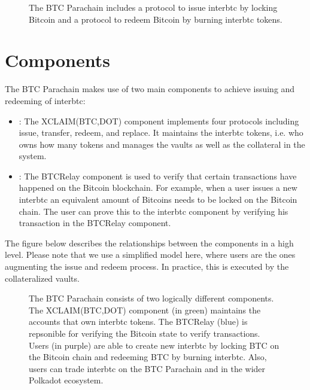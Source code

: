 \documentclass[a4paper,10pt,english]{sphinxmanual}
\begin{document}
\begin{figure}[htbp]
\centering
\capstart

\noindent{}
\caption{The BTC Parachain includes a protocol to issue interbtc by locking Bitcoin and a protocol to redeem Bitcoin by burning interbtc tokens.}\label{\detokenize{intro/at-a-glance:id2}}\end{figure}


\section{Components}
\label{\detokenize{intro/at-a-glance:components}}
The BTC Parachain makes use of two main components to achieve issuing and redeeming of interbtc:
\begin{itemize}
\item {} 
: The XCLAIM(BTC,DOT) component implements four protocols including issue, transfer, redeem, and replace. It maintains the interbtc tokens, i.e. who owns how many tokens and manages the vaults as well as the collateral in the system.

\item {} 
: The BTC\sphinxhyphen{}Relay component is used to verify that certain transactions have happened on the Bitcoin blockchain. For example, when a user issues a new interbtc an equivalent amount of Bitcoins needs to be locked on the Bitcoin chain. The user can prove this to the interbtc component by verifying his transaction in the BTC\sphinxhyphen{}Relay component.

\end{itemize}

The figure below describes the relationships between the components in a high level. Please note that we use a simplified model here, where users are the ones augmenting the issue and redeem process. In practice, this is executed by the collateralized vaults.

\begin{figure}[htbp]
\centering
\capstart

\noindent{}
\caption{The BTC Parachain consists of two logically different components. The XCLAIM(BTC,DOT) component (in green) maintains the accounts that own interbtc tokens. The BTC\sphinxhyphen{}Relay (blue) is repsonible for verifying the Bitcoin state to verify transactions. Users (in purple) are able to create new interbtc by locking BTC on the Bitcoin chain and redeeming BTC by burning interbtc. Also, users can trade interbtc on the BTC Parachain and in the wider Polkadot ecosystem.}\label{\detokenize{intro/at-a-glance:id3}}\end{figure}
\end{document}
